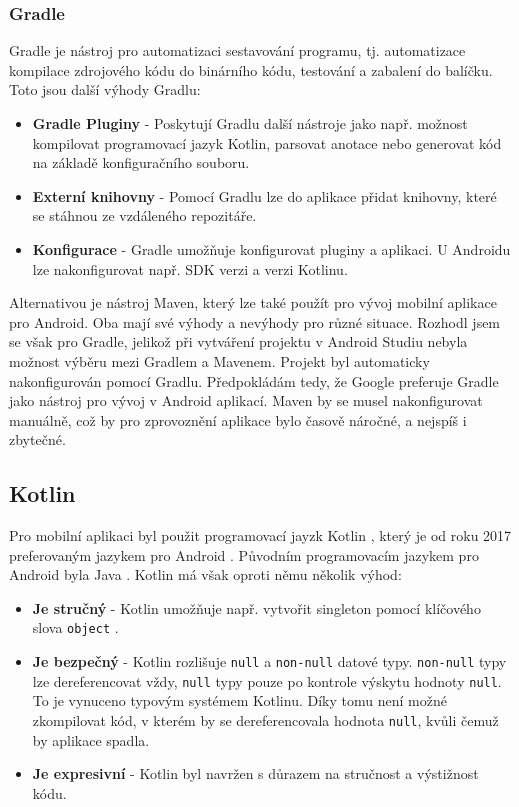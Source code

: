 \subsubsection *{Gradle}
Gradle je nástroj pro automatizaci sestavování programu, tj. automatizace kompilace zdrojového kódu do binárního kódu, testování a zabalení do balíčku. Toto jsou další výhody Gradlu: 

\begin{itemize}
	\item \textbf{Gradle Pluginy} - Poskytují Gradlu další nástroje jako např. možnost kompilovat programovací jazyk Kotlin, parsovat anotace nebo generovat kód na základě konfiguračního souboru. 
	
	\item \textbf{Externí knihovny} - Pomocí Gradlu lze do aplikace přidat knihovny, které se stáhnou ze vzdáleného repozitáře.
	
	\item \textbf{Konfigurace} - Gradle umožňuje konfigurovat pluginy a aplikaci. U Androidu lze nakonfigurovat např. SDK verzi a verzi Kotlinu.
\end{itemize}

\noindent Alternativou je nástroj Maven, který lze také použít pro vývoj mobilní aplikace pro Android. Oba mají své výhody a nevýhody pro různé situace. Rozhodl jsem se však pro Gradle, jelikož při vytváření projektu v Android Studiu nebyla možnost výběru mezi Gradlem a Mavenem. Projekt byl automaticky nakonfigurován pomocí Gradlu. Předpokládám tedy, že Google preferuje Gradle jako nástroj pro vývoj v Android aplikací. Maven by se musel nakonfigurovat manuálně, což by pro zprovoznění aplikace bylo časově náročné, a nejspíš i zbytečné.

\subsection *{Kotlin}
Pro mobilní aplikaci byl použit programovací jayzk Kotlin \cite{kotlin}, který je od roku 2017 preferovaným jazykem pro Android \cite{google-prefers-kotlin}. Původním programovacím jazykem pro Android byla Java \cite{java}. Kotlin má však oproti němu několik výhod:

\begin{itemize}
    \item \textbf{Je stručný} - Kotlin umožňuje např. vytvořit 
    singleton pomocí klíčového slova \lstinline{object} \cite{kotlin-object}.
    
    \item \textbf{Je bezpečný} - Kotlin rozlišuje \lstinline|null| a \lstinline|non-null| datové typy. \lstinline|non-null| typy lze dereferencovat vždy, \lstinline|null| typy pouze po kontrole výskytu hodnoty \lstinline|null|. To je vynuceno typovým systémem Kotlinu. Díky tomu není možné zkompilovat kód, v kterém by se dereferencovala hodnota \lstinline|null|, kvůli čemuž by aplikace spadla.
    
    \item \textbf{Je expresivní} - Kotlin byl navržen s důrazem na stručnost a výstižnost kódu.
\end{itemize}

